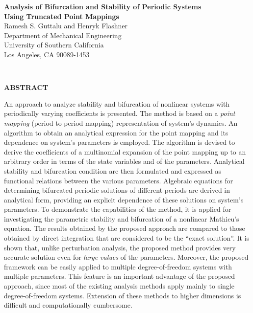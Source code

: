 

\begin{center}
{\large\bf Analysis of Bifurcation and Stability of Periodic Systems\\
 Using Truncated Point Mappings\\}
\vspace{0.25in}
{\sc Ramesh S. Guttalu and Henryk Flashner}\\
Department of Mechanical Engineering \\
University of Southern California\\
Los Angeles, CA 90089-1453
\end{center}
 \ \vspace{0.25in}
\begin{center}
{\large\bf ABSTRACT \\[2ex]}
\end{center}

An approach to analyze stability and bifurcation of nonlinear
systems with periodically varying coefficients is presented. The method is
based on a {\em point mapping} (period to period mapping) representation of
system's dynamics. An algorithm to obtain an analytical expression for the
point mapping and its dependence on system's parameters is employed. The
algorithm is devised to derive the coefficients of a multinomial expansion
of the point mapping up to an arbitrary order in terms of the state
variables and of the parameters. Analytical stability and bifurcation
condition are then formulated and expressed as functional relations between
the various parameters. Algebraic equations for determining bifurcated periodic
solutions of different periods are derived in analytical form, providing an
explicit dependence of these solutions on system's parameters. To
demonstrate the capabilities of the method, it is applied for investigating
the parametric stability and bifurcation of a nonlinear Mathieu's equation.
The results obtained by the proposed approach are compared to those obtained
by direct integration that are considered to be the ``exact solution''. It
is shown that, unlike perturbation analysis, the proposed method provides
very accurate solution even for {\em large values} of the parameters.
Moreover, the proposed framework can be easily applied to
multiple degree-of-freedom systems with multiple parameters.  This feature is
an important advantage of the proposed approach, since most of the
existing analysis methods apply mainly to single degree-of-freedom systems.
Extension of these methods to higher
dimensions is difficult and computationally cumbersome.


